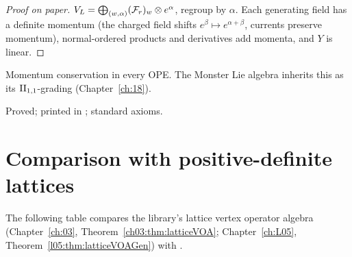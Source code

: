 \begin{proof}[Proof on paper]
$V_L=\bigoplus_{(w,\alpha)}(\mathcal{F}_r)_w\otimes e^\alpha$, regroup by $\alpha$.  Each generating field has a definite momentum
(the charged field shifts $e^\beta\mapsto e^{\alpha+\beta}$, currents preserve momentum), normal-ordered products and
derivatives add momenta, and $Y$ is linear.
\end{proof}

\begin{physics}
Momentum conservation in every OPE.  The Monster Lie algebra inherits this as its ${\mathrm{II}_{1,1}}$-grading
(Chapter~\ref{ch:18}).
\end{physics}

\begin{status}
Proved; printed in ; standard axioms.
\end{status}

\section{Comparison with positive-definite lattices}\label{ch17:sec:compare}

The following table compares the library's lattice vertex operator algebra 
(Chapter~\ref{ch:03}, Theorem~\ref{ch03:thm:latticeVOA}; Chapter~\ref{ch:L05},
Theorem~\ref{l05:thm:latticeVOAGen}) with .

